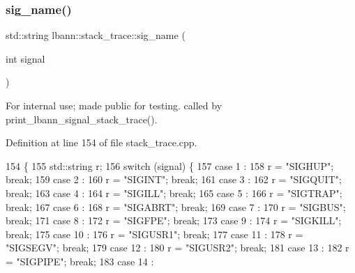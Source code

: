 \subsubsection{\texorpdfstring{sig\+\_\+name()}{sig\_name()}}
{\footnotesize\ttfamily std\+::string lbann\+::stack\+\_\+trace\+::sig\+\_\+name (\begin{DoxyParamCaption}\item[{int}]{signal }\end{DoxyParamCaption})}

For internal use; made public for testing. called by print\+\_\+lbann\+\_\+signal\+\_\+stack\+\_\+trace(). 

Definition at line 154 of file stack\+\_\+trace.\+cpp.


\begin{DoxyCode}
154                                \{
155   std::string r;
156   \textcolor{keywordflow}{switch} (signal) \{
157     \textcolor{keywordflow}{case} 1 : 
158       r = \textcolor{stringliteral}{"SIGHUP"}; \textcolor{keywordflow}{break};
159     \textcolor{keywordflow}{case} 2 :
160       r = \textcolor{stringliteral}{"SIGINT"}; \textcolor{keywordflow}{break};
161     \textcolor{keywordflow}{case} 3 :
162       r = \textcolor{stringliteral}{"SIGQUIT"}; \textcolor{keywordflow}{break};
163     \textcolor{keywordflow}{case} 4 :
164       r = \textcolor{stringliteral}{"SIGILL"}; \textcolor{keywordflow}{break};
165     \textcolor{keywordflow}{case} 5 :
166       r = \textcolor{stringliteral}{"SIGTRAP"}; \textcolor{keywordflow}{break};
167     \textcolor{keywordflow}{case} 6 :
168       r = \textcolor{stringliteral}{"SIGABRT"}; \textcolor{keywordflow}{break};
169     \textcolor{keywordflow}{case} 7 :
170       r = \textcolor{stringliteral}{"SIGBUS"}; \textcolor{keywordflow}{break};
171     \textcolor{keywordflow}{case} 8 :
172       r = \textcolor{stringliteral}{"SIGFPE"}; \textcolor{keywordflow}{break};
173     \textcolor{keywordflow}{case} 9 :
174       r = \textcolor{stringliteral}{"SIGKILL"}; \textcolor{keywordflow}{break};
175     \textcolor{keywordflow}{case} 10 :
176       r = \textcolor{stringliteral}{"SIGUSR1"}; \textcolor{keywordflow}{break};
177     \textcolor{keywordflow}{case} 11 :
178       r = \textcolor{stringliteral}{"SIGSEGV"}; \textcolor{keywordflow}{break};
179     \textcolor{keywordflow}{case} 12 :
180       r = \textcolor{stringliteral}{"SIGUSR2"}; \textcolor{keywordflow}{break};
181     \textcolor{keywordflow}{case} 13 :
182       r = \textcolor{stringliteral}{"SIGPIPE"}; \textcolor{keywordflow}{break};
183     \textcolor{keywordflow}{case} 14 :

\end{DoxyCode}
